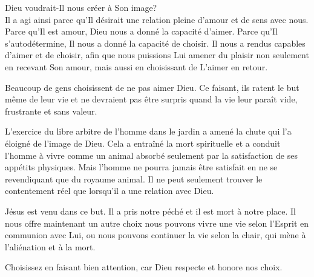 




 Dieu voudrait-Il nous créer à Son image? \\[1ex]
Il a agi ainsi parce qu'Il désirait une relation pleine d'amour et de sens avec
 nous. Parce qu'Il est amour, Dieu nous a donné la capacité d'aimer. Parce qu'Il
 s'autodétermine, Il nous a donné la capacité de choisir. Il nous a rendus
 capables d'aimer et de choisir, afin que nous puissions Lui amener du plaisir
 \ocadr{}non seulement en recevant Son amour, mais aussi en choisissant de L'aimer
 en retour. 

Beaucoup de gens choisissent de ne pas aimer Dieu. Ce faisant, ils ratent le but
 même de leur vie et ne devraient pas être surpris quand la vie leur paraît vide,
 frustrante et sans valeur.


L'exercice du libre arbitre de l'homme dans le jardin a amené la chute qui l'a
 éloigné de l'image de Dieu. Cela a entraîné la mort spirituelle et a conduit
 l'homme à vivre comme un animal \ocadr{}absorbé seulement par la satisfaction de ses
 appétits physiques. Mais l'homme ne pourra jamais être satisfait en ne se
 revendiquant que du royaume animal. Il ne peut seulement trouver le contentement
 réel que lorsqu'il a une relation avec Dieu. 

Jésus est venu dans ce but. Il a pris notre péché et il est mort à notre place.
 Il nous offre maintenant un autre choix \ocadr{}nous pouvons vivre une vie selon
 l'Esprit en communion avec Lui, ou nous pouvons continuer la vie selon la chair,
 qui mène à l'aliénation et à la mort. 

Choisissez en faisant bien attention, car Dieu respecte et honore nos choix. 

\dvrule





